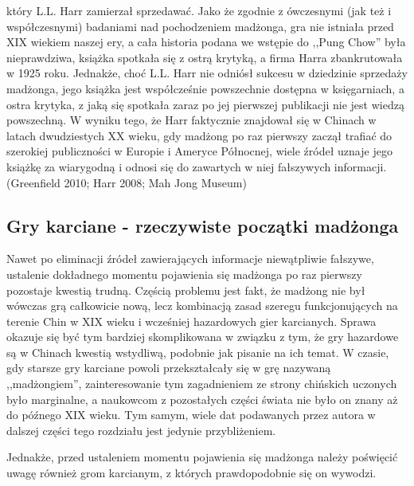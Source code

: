 który L.L. Harr zamierzał sprzedawać. Jako że zgodnie z ówczesnymi (jak
też i współczesnymi) badaniami nad pochodzeniem madżonga, gra nie istniała przed
XIX wiekiem naszej ery, a cała historia podana we wstępie do ,,Pung Chow'' była
nieprawdziwa, książka spotkała się z ostrą krytyką, a firma Harra zbankrutowała
w 1925 roku. Jednakże, choć L.L. Harr nie odniósł sukcesu w dziedzinie sprzedaży
madżonga, jego książka jest współcześnie powszechnie dostępna w księgarniach, a
ostra krytyka, z jaką się spotkała zaraz po jej pierwszej publikacji nie jest
wiedzą powszechną. W wyniku tego, że Harr faktycznie znajdował się w Chinach w
latach dwudziestych XX wieku, gdy madżong po raz pierwszy zaczął trafiać do
szerokiej publiczności w Europie i Ameryce Północnej, wiele źródeł uznaje jego
książkę za wiarygodną i odnosi się do zawartych w niej fałszywych informacji.
(Greenfield 2010; Harr 2008; Mah Jong Museum)
\subsection{Gry karciane - rzeczywiste początki madżonga}
Nawet po eliminacji źródeł zawierających informacje niewątpliwie fałszywe,
ustalenie dokładnego momentu pojawienia się madżonga po raz pierwszy pozostaje
kwestią trudną. Częścią problemu jest fakt, że madżong nie był wówczas grą
całkowicie nową, lecz kombinacją zasad szeregu funkcjonujących na terenie Chin w
XIX wieku i wcześniej hazardowych gier karcianych. Sprawa okazuje się być tym
bardziej skomplikowana w związku z tym, że gry hazardowe są w Chinach kwestią
wstydliwą, podobnie jak pisanie na ich temat. W czasie, gdy starsze gry karciane
powoli przekształcały się w grę nazywaną ,,madżongiem'', zainteresowanie tym
zagadnieniem ze strony chińskich uczonych było marginalne, a naukowcom z
pozostałych części świata nie było on znany aż do późnego XIX wieku.
Tym samym, wiele dat podawanych przez autora w dalszej części tego rozdziału
jest jedynie przybliżeniem.

Jednakże, przed ustaleniem momentu pojawienia się madżonga należy poświęcić
uwagę również grom karcianym, z których prawdopodobnie się on wywodzi.

